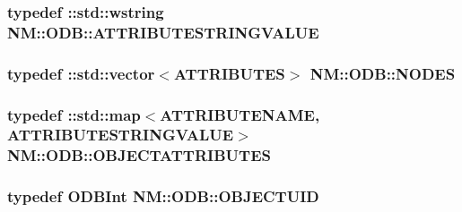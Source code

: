 \subsubsection[{A\+T\+T\+R\+I\+B\+U\+T\+E\+S\+T\+R\+I\+N\+G\+V\+A\+L\+U\+E}]{\setlength{\rightskip}{0pt plus 5cm}typedef \+::std\+::wstring {\bf N\+M\+::\+O\+D\+B\+::\+A\+T\+T\+R\+I\+B\+U\+T\+E\+S\+T\+R\+I\+N\+G\+V\+A\+L\+U\+E}}\label{namespace_n_m_1_1_o_d_b_a10ebd904480d7e3c24aae1b9a541244f}
\hypertarget{namespace_n_m_1_1_o_d_b_a613699879177c24fa47723325b9be6cb}{}
\subsubsection[{N\+O\+D\+E\+S}]{\setlength{\rightskip}{0pt plus 5cm}typedef \+::std\+::vector$<${\bf A\+T\+T\+R\+I\+B\+U\+T\+E\+S}$>$ {\bf N\+M\+::\+O\+D\+B\+::\+N\+O\+D\+E\+S}}\label{namespace_n_m_1_1_o_d_b_a613699879177c24fa47723325b9be6cb}
\hypertarget{namespace_n_m_1_1_o_d_b_a8770283da9792324e1afe8104d40123b}{}
\subsubsection[{O\+B\+J\+E\+C\+T\+A\+T\+T\+R\+I\+B\+U\+T\+E\+S}]{\setlength{\rightskip}{0pt plus 5cm}typedef \+::std\+::map$<${\bf A\+T\+T\+R\+I\+B\+U\+T\+E\+N\+A\+M\+E}, {\bf A\+T\+T\+R\+I\+B\+U\+T\+E\+S\+T\+R\+I\+N\+G\+V\+A\+L\+U\+E}$>$ {\bf N\+M\+::\+O\+D\+B\+::\+O\+B\+J\+E\+C\+T\+A\+T\+T\+R\+I\+B\+U\+T\+E\+S}}\label{namespace_n_m_1_1_o_d_b_a8770283da9792324e1afe8104d40123b}
\hypertarget{namespace_n_m_1_1_o_d_b_a262b64fab56baaa96e18bac4ada88265}{}
\subsubsection[{O\+B\+J\+E\+C\+T\+U\+I\+D}]{\setlength{\rightskip}{0pt plus 5cm}typedef {\bf O\+D\+B\+Int} {\bf N\+M\+::\+O\+D\+B\+::\+O\+B\+J\+E\+C\+T\+U\+I\+D}}\label{namespace_n_m_1_1_o_d_b_a262b64fab56baaa96e18bac4ada88265}
\hypertarget{namespace_n_m_1_1_o_d_b_a9e7aa4d096ccb752b1251596f1728865}{}

